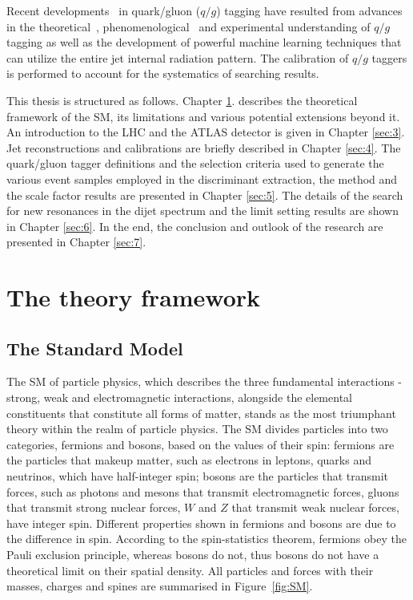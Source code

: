 \documentclass[UTF8,12pt]{ctexart}
\numberwithin{equation}{section}
\begin{document}
Recent developments~\cite{CMS:2021iwu,ref22,CMS:2017yer,CMS:2013kfv,CMS:2017pcy,PhysRevD.98.092014,CMS:2018vzn,Altheimer:2012mn,Andersen:2016qtm,Larkoski:2014pca,CDF:2005prv,OPAL:1999jkz,CLEO:2007tqf,DELPHI:1999gah,ZEUS:2004gcp,ref24,Komiske:2016rsd} in quark/gluon ($q/g$) tagging have resulted from advances in the theoretical~\cite{ref16}, phenomenological~\cite{ref17, ref18, Gras:2017jty, Komiske:2018vkc} and experimental understanding of $q/g$ tagging as well as the development of powerful machine learning techniques that can utilize the entire jet internal radiation pattern. The calibration of $q/g$ taggers is performed to account for the systematics of searching results. 


This thesis is structured as follows. Chapter \ref{sec:2}. describes the theoretical framework of the SM, its limitations and various potential extensions beyond it. An introduction to the LHC and the ATLAS detector is given in Chapter \ref{sec:3}. Jet reconstructions and calibrations are briefly described in Chapter \ref{sec:4}. The quark/gluon tagger definitions and the selection criteria used to generate the various event samples employed in the discriminant extraction, the method and the scale factor results are presented in Chapter \ref{sec:5}. The details of the search for new resonances in the dijet spectrum and the limit setting results are shown in Chapter \ref{sec:6}. In the end, the conclusion and outlook of the research are presented in Chapter \ref{sec:7}.




\newpage
{}
\section{The theory framework}
\label{sec:2}
\subsection{The Standard Model}
\label{sec:2.1}

The SM of particle physics, which describes the three fundamental interactions - strong, weak and electromagnetic interactions, alongside the elemental constituents that constitute all forms of matter, stands as the most triumphant theory within the realm of particle physics. 
The SM divides particles into two categories, fermions and bosons, based on the values of their spin: fermions are the particles that makeup matter, such as electrons in leptons, quarks and neutrinos, which have half-integer spin; bosons are the particles that transmit forces, such as photons and mesons that transmit electromagnetic forces, gluons that transmit strong nuclear forces, $W$ and $Z$ that transmit weak nuclear forces, have integer spin.  Different properties shown in fermions and bosons are due to the difference in spin. According to the spin-statistics theorem, fermions obey the Pauli exclusion principle, whereas bosons do not, thus bosons do not have a theoretical limit on their spatial density. All particles and forces with their masses, charges and spines are summarised in Figure~\ref{fig:SM}.
\end{document}
